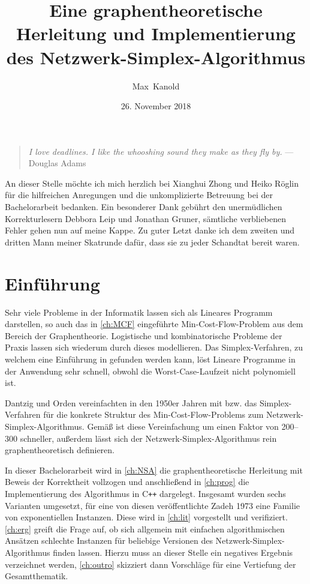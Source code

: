 \documentclass[11pt,a4paper,twoside,ngerman,openany,bibliography=totoc]{scrbook}
\author{Max~Kanold}
\date{26. November 2018}
\title{Eine graphentheoretische Herleitung und Implementierung des Netzwerk-Simplex-Algorithmus}
\theoremstyle{plain}
\theoremstyle{definition}
\newcommand{\cpp}{C\texttt{++}\xspace}
\begin{document}
\frontmatter
\maketitle
\null\vfill
\begin{quote}
    \emph{I love deadlines. I like the whooshing sound they make as they fly by.}
    \flushright --- Douglas Adams
\end{quote}
\vfill\vfill\vfill
An dieser Stelle möchte ich mich herzlich bei Xianghui Zhong und Heiko Röglin für die hilfreichen Anregungen und die unkomplizierte Betreuung bei der Bachelorarbeit bedanken. Ein besonderer Dank gebührt den unermüdlichen Korrekturlesern Debbora Leip und Jonathan Gruner, sämtliche verbliebenen Fehler gehen nun auf meine Kappe. Zu guter Letzt danke ich dem zweiten und dritten Mann meiner Skatrunde dafür, dass sie zu jeder Schandtat bereit waren.
\thispagestyle{empty}
\clearpage

\tableofcontents
\thispagestyle{empty}
\cleardoublepage

\mainmatter
\chapter{Einführung}
Sehr viele Probleme in der Informatik lassen sich als Lineares Programm darstellen, so auch das in \cref{ch:MCF} eingeführte Min-Cost-Flow-Problem aus dem Bereich der Graphentheorie. Logistische und kombinatorische Probleme der Praxis lassen sich wiederum durch dieses modellieren. Das Simplex-Verfahren, zu welchem eine Einführung in \cite{NSAbook} gefunden werden kann, löst Lineare Programme in der Anwendung sehr schnell, obwohl die Worst-Case-Laufzeit nicht polynomiell ist. 

Dantzig und Orden vereinfachten in den 1950er Jahren mit \cite{erf1} bzw. \cite{erf2} das Simplex-Verfahren für die konkrete Struktur des Min-Cost-Flow-Problems zum Netzwerk-Simplex-Algorithmus. Gemäß \cite[S. 445]{LP&NF2010} ist diese Vereinfachung um einen Faktor von 200--300 schneller, außerdem lässt sich der Netzwerk-Simplex-Algorithmus rein graphentheoretisch definieren.

In dieser Bachelorarbeit wird in \cref{ch:NSA} die graphentheoretische Herleitung mit Beweis der Korrektheit vollzogen und anschließend in \cref{ch:prog} die Implementierung des Algorithmus in \cpp dargelegt. Insgesamt wurden sechs Varianten umgesetzt, für eine von diesen veröffentlichte Zadeh 1973 eine Familie von exponentiellen Instanzen. Diese wird in \cref{ch:lit} vorgestellt und verifiziert. \cref{ch:erg} greift die Frage auf, ob sich allgemein mit einfachen algorithmischen Ansätzen schlechte Instanzen für beliebige Versionen des Netzwerk-Simplex-Algorithmus finden lassen. Hierzu muss an dieser Stelle ein negatives Ergebnis verzeichnet werden, \cref{ch:outro} skizziert dann Vorschläge für eine Vertiefung der Gesamtthematik.
\end{document}
